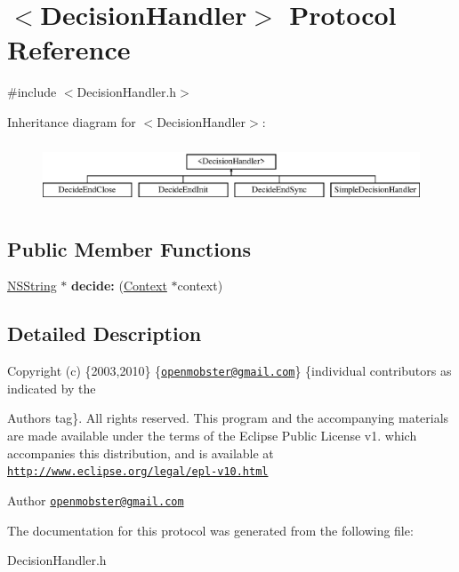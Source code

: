 \hypertarget{protocol_decision_handler-p}{
\section{$<$\-Decision\-Handler$>$ \-Protocol \-Reference}
\label{protocol_decision_handler-p}
}


{\ttfamily \#include $<$\-Decision\-Handler.\-h$>$}

\-Inheritance diagram for $<$\-Decision\-Handler$>$\-:\begin{figure}[H]
\begin{center}
\leavevmode
\includegraphics[height=1.854305cm]{protocol_decision_handler-p}
\end{center}
\end{figure}
\subsection*{\-Public \-Member \-Functions}
\begin{DoxyCompactItemize}
\item 
\hypertarget{protocol_decision_handler-p_a41f7c470703712a24aac7e4cd1f5e17b}{
\hyperlink{class_n_s_string}{\-N\-S\-String} $\ast$ {\bfseries decide\-:} (\hyperlink{interface_context}{\-Context} $\ast$context)}
\label{protocol_decision_handler-p_a41f7c470703712a24aac7e4cd1f5e17b}

\end{DoxyCompactItemize}


\subsection{\-Detailed \-Description}
\-Copyright (c) \{2003,2010\} \{\href{mailto:openmobster@gmail.com}{\tt openmobster@gmail.\-com}\} \{individual contributors as indicated by the \begin{DoxyAuthor}{\-Authors}
tag\}. \-All rights reserved. \-This program and the accompanying materials are made available under the terms of the \-Eclipse \-Public \-License v1. which accompanies this distribution, and is available at \href{http://www.eclipse.org/legal/epl-v10.html}{\tt http\-://www.\-eclipse.\-org/legal/epl-\/v10.\-html}
\end{DoxyAuthor}
\begin{DoxyAuthor}{\-Author}
\href{mailto:openmobster@gmail.com}{\tt openmobster@gmail.\-com} 
\end{DoxyAuthor}


\-The documentation for this protocol was generated from the following file\-:\begin{DoxyCompactItemize}
\item 
\-Decision\-Handler.\-h\end{DoxyCompactItemize}
